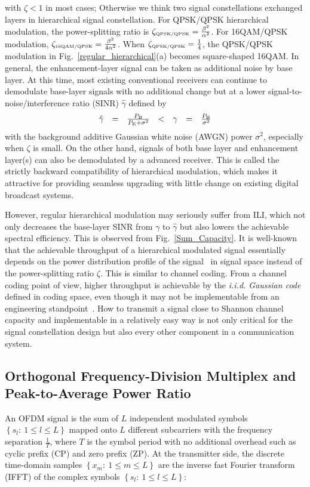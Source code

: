 \documentclass[10pt,fleqn, twocolumn]{IEEEtran}
\begin{document}
\noindent with $\zeta < 1$ in most cases; Otherwise we think two
signal constellations exchanged layers in hierarchical signal
constellation. For QPSK/QPSK hierarchical modulation, the
power-splitting ratio is $\zeta_{\mbox{\tiny QPSK/QPSK}}=
\frac{\beta^{2}}{\alpha^2}$. For 16QAM/QPSK modulation,
$\zeta_{\mbox{\tiny 16QAM/QPSK}}= \frac{\beta^{2}}{4\alpha^2}$.
When $\zeta_{\mbox{\tiny QPSK/QPSK}}=\frac{1}{4}$, the QPSK/QPSK
modulation in Fig.~\ref{regular_hierarchical}(a) becomes
square-shaped 16QAM. In general, the enhancement-layer signal can
be taken as additional noise by base layer. At this time, most
existing conventional receivers can continue to demodulate
base-layer signals with no additional change but at a lower
signal-to-noise/interference ratio (SINR) $\hat{\gamma}$ defined
by
\begin{equation}
\begin{array}{rcccccl}
\hat{\gamma}& = & \frac{P_{\rm B}}{P_{\rm
E}+\sigma^2}&<&\gamma&=&\frac{P_{\rm B}}{\sigma^2}
\end{array}\label{SINR}
\end{equation}
\noindent with the background additive Gaussian white noise (AWGN)
power $\sigma^2$,  especially when $\zeta$ is small. On the other
hand, signals of both base layer and enhancement layer(s) can also
be demodulated by a advanced receiver. This is called the strictly
backward compatibility of hierarchical modulation, which makes it
attractive for providing seamless upgrading with little change on
existing digital broadcast systems.

However, regular hierarchical modulation may seriously suffer from
ILI, which not only decreases the base-layer SINR from ${\gamma}$
to $\hat{\gamma}$ but also lowers the achievable spectral
efficiency. This is observed from Fig.~\ref{Sum_Capacity}. It is
well-known that the achievable throughput of a hierarchical
modulated signal essentially depends on the power distribution
profile of the signal~\cite{Unge82} in signal space instead of the
power-splitting ratio $\zeta$. This is similar to channel coding.
From a channel coding point of view, higher throughput is
achievable by the {\em i.i.d. Gaussian code} defined in coding
space, even though it may not be implementable from an engineering
standpoint~\cite{Cover72}. How to transmit a signal close to
Shannon channel capacity and implementable in a relatively easy
way is not only critical for the signal constellation design but
also every other component in a communication system.

\subsection{Orthogonal Frequency-Division Multiplex and Peak-to-Average Power Ratio}
An OFDM signal is the sum of $L$ independent modulated symbols
$\left\{s_{l}:\ 1\leq l\leq L\right\}$ mapped onto $L$ different
subcarriers with the frequency separation $\frac{1}{T}$, where $T$
is the symbol period with no additional overhead such as cyclic
prefix (CP) and zero prefix (ZP). At the transmitter side, the
discrete time-domain samples $\left\{x_{m}:\ 1\leq m\leq
L\right\}$ are the inverse fast Fourier transform (IFFT) of the
complex symbols $\left\{s_{l}:\ 1\leq l\leq L\right\}$:
\end{document}
